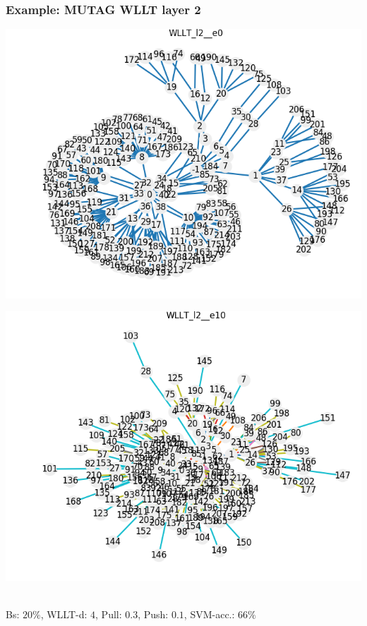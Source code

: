 \begin{frame}\frametitle{Example: MUTAG WLLT layer 2}
	\begin{minipage}{0.49\textwidth}
		\includegraphics[width=\textwidth]{images/plotWlltl4}
	\end{minipage}
	\begin{minipage}{0.49\textwidth}
		\includegraphics[width=\textwidth]{images/plotWlltl5}
	\end{minipage}
	\vspace{2cm} \\
	\tiny{Bs: $20\%$, WLLT-d: $4$, Pull: $0.3$, Push: $0.1$, SVM-acc.: $66\%$}
\end{frame}

